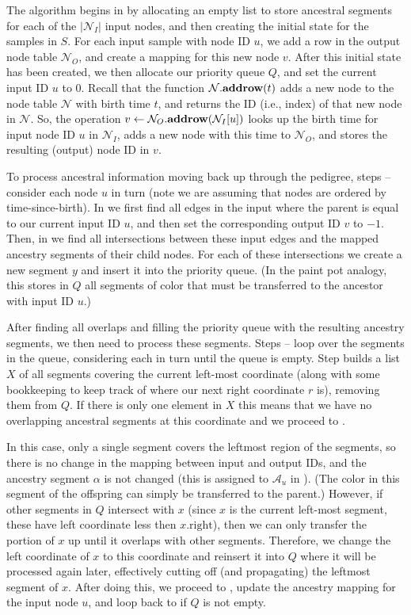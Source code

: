 \documentclass{article}
\newcommand{\Nt}{\mathcal{N}}  %
\newcommand{\Al}{\mathcal{A}}  %
\newcommand{\taddrow}[2]{#1.\mbox{\textbf{addrow}}(#2)}
\newcommand{\attrright}[1]{#1.\mbox{right}}
\begin{document}
The algorithm begins in  by allocating an empty list to store ancestral
segments for each of the $|\Nt_I|$ input nodes, and then creating the initial
state for the samples in $S$. For each input sample with node ID $u$, we
add a row in the output node table $\Nt_O$, and create a mapping for this
new node $v$. After this initial state has been created, we then allocate our
priority queue $Q$, and set the current input ID $u$ to $0$.
Recall that the function $\taddrow{\Nt}{t}$ adds a new node to the node table $\Nt$
with birth time $t$, and returns the ID (i.e., index) of that new node in $\Nt$.
So, the operation $v \leftarrow \taddrow{\Nt_O}{\Nt_I[u]}$ looks up the birth time
for input node ID $u$ in $\Nt_I$, adds a new node with this time to $\Nt_O$,
and stores the resulting (output) node ID in $v$.

To process ancestral information moving back up through the pedigree, steps --
consider each node $u$ in turn (note we are assuming that nodes are ordered by time-since-birth).
In  we first find all edges in the input where the parent is equal to
our current input ID $u$, and then set the corresponding output ID $v$ to $-1$.
Then, in  we find all intersections between these input edges and the
mapped ancestry segments of their child nodes.
For each of these intersections we
create a new segment $y$ and insert it into the priority queue.
(In the paint pot analogy,
this stores in $Q$ all segments of color that must be transferred to the ancestor
with input ID $u$.)

After finding all overlaps and filling the priority queue with the resulting ancestry
segments, we then need to process these segments. Steps --
loop over the segments in the queue, considering each in turn until the queue is empty.
Step  builds a list $X$ of all segments covering the current left-most coordinate
(along with some bookkeeping to keep track of where our next
right coordinate $r$ is), removing them from $Q$. If there is only one element in $X$
this means that we have no overlapping ancestral segments at this coordinate and
we proceed to .

In this case, only a single segment covers the leftmost region of the segments,
so there is no change in the mapping between input and output IDs,
and the ancestry segment $\alpha$ is not changed (this is assigned to $\Al_u$ in ).
(The color in this segment of the offspring can simply be transferred to the parent.)
However, if other segments in $Q$ intersect with $x$
(since $x$ is the current left-most segment, these have left coordinate less then $\attrright{x}$),
then we can only transfer the portion of $x$ up until it overlaps with other segments.
Therefore, we change the left coordinate
of $x$ to this coordinate and reinsert it into $Q$ where it will be processed again
later, effectively cutting off (and propagating) the leftmost segment of $x$.
After doing this, we proceed to , update the ancestry mapping for
the input node $u$, and loop back to  if $Q$ is not empty.
\end{document}
